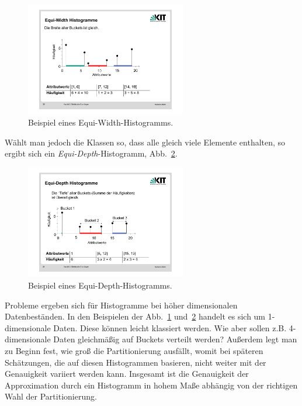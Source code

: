 \begin{figure}[ht]
	\centering
	\includegraphics[width=0.625\textwidth]{Figures/equiWidth}
	\caption[Equi-Width Beispiel]{Beispiel eines Equi-Width-Histogramms.\footnotemark}
	\label{fig:equiWidth}
\end{figure}

\noindent Wählt man jedoch die Klassen so, dass alle gleich viele Elemente enthalten, so ergibt sich ein \textit{Equi-Depth}-Histogramm, Abb.~\ref{fig:equiDepth}.

\begin{figure}[ht]
	\centering
	\includegraphics[width=0.625\textwidth]{Figures/equiDepth}
	\caption[Equi-Width Beispiel]{Beispiel eines Equi-Depth-Histogramms.\footnotemark}
	\label{fig:equiDepth}
\end{figure}

Probleme ergeben sich für Histogramme bei höher dimensionalen Datenbeständen. In den Beispielen der Abb.~\ref{fig:equiWidth} und~\ref{fig:equiDepth} handelt es sich um 1-dimensionale Daten. Diese können leicht klassiert werden. Wie aber sollen z.B. 4-dimensionale Daten gleichmäßig auf Buckets verteilt werden? Außerdem legt man zu Beginn fest, wie groß die Partitionierung ausfällt, womit bei späteren Schätzungen, die auf diesen Histogrammen basieren, nicht weiter mit der Genauigkeit variiert werden kann. Insgesamt ist die Genauigkeit der Approximation durch ein Histogramm in hohem Maße abhängig von der richtigen Wahl der Partitionierung.

